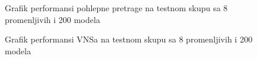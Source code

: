 \documentclass[12pt,oneside]{memoir}
\begin{document}
\vspace{2cm}

\begin{figure}[H]
    \centering
    \hfill
    \caption{Grafik performansi pohlepne pretrage na testnom skupu sa 8 promenljivih i 200 modela}
    \label{fig:test2_greedy_performance}
\end{figure}

\vspace{2cm}

\begin{figure}[H]
    \centering
    \hfill
    \caption{Grafik performansi VNSa na testnom skupu sa 8 promenljivih i 200 modela}
    \label{fig:test2_vns_performance}
\end{figure}
\end{document}
